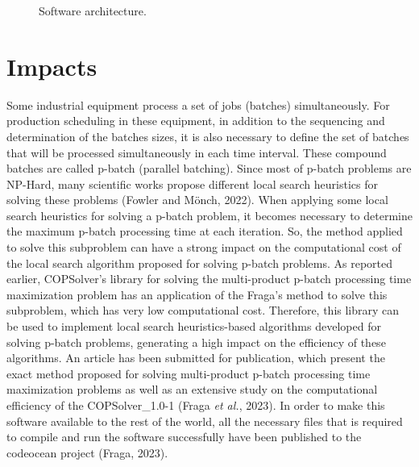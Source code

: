 \documentclass[11pt, letterpaper]{article}
\begin{document}
\begin{figure}[h]
\begin{center}
\end{center}
\caption{Software architecture.}
\end{figure}

\section{Impacts}

Some industrial equipment process a set of jobs (batches) simultaneously. For production scheduling in these equipment, in addition to the sequencing and determination of the batches sizes, it is also necessary to define the set of batches that will be processed simultaneously in each time interval. These compound batches are called p-batch (parallel batching). Since most of p-batch problems are NP-Hard, many scientific works propose different local search heuristics for solving these problems (Fowler and Mönch, 2022). When applying some local search heuristics for solving a p-batch problem, it becomes necessary to determine the maximum p-batch processing time at each iteration. So, the method applied to solve this subproblem can have a strong impact on the computational cost of the local search algorithm proposed for solving p-batch problems. As reported earlier, COPSolver's library for solving the multi-product p-batch processing time maximization problem has an application of the Fraga's method to solve this subproblem, which has very low computational cost. Therefore, this library can be used to implement local search heuristics-based algorithms developed for solving p-batch problems, generating a high impact on the efficiency of these algorithms. An article has been submitted for publication, which present the exact method proposed for solving multi-product p-batch processing time maximization problems as well as an extensive study on the computational efficiency of the COPSolver\_1.0-1 (Fraga \emph{et al.}, 2023). In order to make this software available to the rest of the world, all the necessary files that is required to compile and run the software successfully have been published to the codeocean project (Fraga, 2023).
\end{document}
